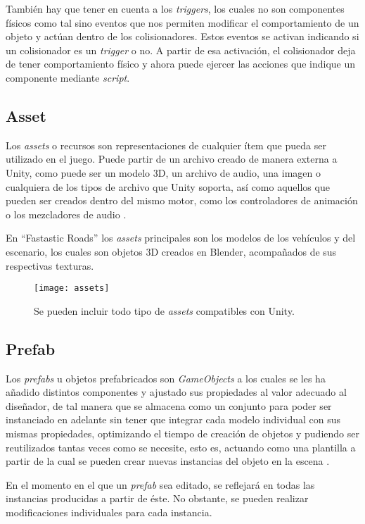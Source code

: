 También hay que tener en cuenta a los \textit{triggers}, los cuales no son componentes físicos como tal sino eventos que nos permiten modificar el comportamiento de un objeto y actúan dentro de los colisionadores. Estos eventos se activan indicando si un colisionador es un \textit{trigger} o no. A partir de esa activación, el colisionador deja de tener comportamiento físico y ahora puede ejercer las acciones que indique un componente mediante \textit{script}.

\subsection{Asset}

Los \textit{assets} o recursos son representaciones de cualquier ítem que pueda ser utilizado en el juego. Puede partir de un archivo creado de manera externa a Unity, como puede ser un modelo 3D, un archivo de audio, una imagen o cualquiera de los tipos de archivo que Unity soporta, así como aquellos que pueden ser creados dentro del mismo motor, como los controladores de animación o los mezcladores de audio \cite{doc:assets}.

En ``Fastastic Roads'' los \textit{assets} principales son los modelos de los vehículos y del escenario, los cuales son objetos 3D creados en Blender, acompañados de sus respectivas texturas.

\begin{figure}[h]
	\centering
	\texttt{[image: assets]}
	\caption{Se pueden incluir todo tipo de \textit{assets} compatibles con Unity.}
	\label{fig:assets}
\end{figure}

\subsection{Prefab}

Los \textit{prefabs} u objetos prefabricados son \textit{GameObjects} a los cuales se les ha añadido distintos componentes y ajustado sus propiedades al valor adecuado al diseñador, de tal manera que se almacena como un conjunto para poder ser instanciado en adelante sin tener que integrar cada modelo individual con sus mismas propiedades, optimizando el tiempo de creación de objetos y pudiendo ser reutilizados tantas veces como se necesite, esto es, actuando como una plantilla a partir de la cual se pueden crear nuevas instancias del objeto en la escena \cite{doc:prefab}.

En el momento en el que un \textit{prefab} sea editado, se reflejará en todas las instancias producidas a partir de éste. No obstante, se pueden realizar modificaciones individuales para cada instancia.

